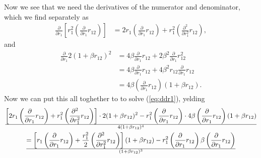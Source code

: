 Now we see that we need the derivatives of the numerator and denominator, which we find separately as
\begin{align*}
    \frac{\partial}{\partial r_1} \left[ r_1^2 \left(\frac{\partial}{\partial r_1}r_{12}\right) \right]
    &= 2r_1 \left(\frac{\partial}{\partial r_1}r_{12}\right) + r_1^2 \left(\frac{\partial^2}{\partial r_1^2}r_{12}\right),
\end{align*}
and
\begin{align*}
    \frac{\partial}{\partial r_1} 2(1+\beta r_{12})^2
    &= 4\beta\frac{\partial}{\partial r_1}r_{12} + 2\beta^2\frac{\partial}{\partial r_1}r_{12}^2 \\
    &= 4\beta\frac{\partial}{\partial r_1}r_{12} + 4\beta^2r_{12}\frac{\partial}{\partial r_1}r_{12} \\
    &= 4\beta\left(\frac{\partial}{\partial r_1}r_{12}\right) (1 + \beta r_{12}).
\end{align*}
Now we can put this all toghether to to solve (\ref{eq:ddr1}), yelding
\begin{gather*}
    { \left[ 2r_1 \left(\frac{\partial}{\partial r_1}r_{12} \right) + r_1^2 \left(\frac{\partial^2}{\partial r_1^2}r_{12}\right) \right] \cdot 2(1+\beta r_{12})^2 - r_1^2 \left(\frac{\partial}{\partial r_1}r_{12}\right) \cdot 4\beta\left(\frac{\partial}{\partial r_1}r_{12}\right) (1 + \beta r_{12}) } 
    \over {4(1+\beta r_{12})^4} \\
    = { \left[ r_1 \left(\frac{\partial}{\partial r_1}r_{12} \right) + \frac{r_1^2}{2} \left(\frac{\partial^2}{\partial r_1^2}r_{12}\right) \right] (1+\beta r_{12}) - r_1^2 \left(\frac{\partial}{\partial r_1}r_{12}\right) \beta\left(\frac{\partial}{\partial r_1}r_{12}\right) } 
    \over {(1+\beta r_{12})^3}
\end{gather*}


